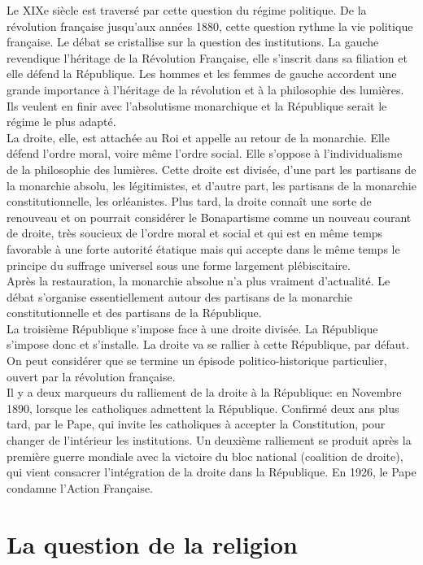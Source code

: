 \documentclass[10pt, a4paper, openany]{book}
\begin{document}
Le XIXe siècle est traversé par cette question du régime politique. De la révolution française jusqu'aux années 1880, cette question rythme la vie politique française. Le débat se cristallise sur la question des institutions. La gauche revendique l'héritage de la Révolution Française, elle s'inscrit dans sa filiation et elle défend la République. Les hommes et les femmes de gauche accordent une grande importance à l'héritage de la révolution et à la philosophie des lumières. Ils veulent en finir avec l'absolutisme monarchique et la République serait le régime le plus adapté. \\
La droite, elle, est attachée au Roi et appelle au retour de la monarchie. Elle défend l'ordre moral, voire même l'ordre social. Elle s'oppose à l'individualisme de la philosophie des lumières. Cette droite est divisée, d'une part les partisans de la monarchie absolu, les légitimistes, et d'autre part, les partisans de la monarchie constitutionnelle, les orléanistes. Plus tard, la droite connaît une sorte de renouveau et on pourrait considérer le Bonapartisme comme un nouveau courant de droite, très soucieux de l'ordre moral et social et qui est en même temps favorable à une forte autorité étatique mais qui accepte dans le même temps le principe du suffrage universel sous une forme largement plébiscitaire. \\
Après la restauration, la monarchie absolue n'a plus vraiment d'actualité. Le débat s'organise essentiellement autour des partisans de la monarchie constitutionnelle et des partisans de la République. \\
La troisième République s'impose face à une droite divisée. La République s'impose donc et s'installe. La droite va se rallier à cette République, par défaut. On peut considérer que se termine un épisode politico-historique particulier, ouvert par la révolution française. \\
Il y a deux marqueurs du ralliement de la droite à la République: en Novembre 1890, lorsque les catholiques admettent la République. Confirmé deux ans plus tard, par le Pape, qui invite les catholiques à accepter la Constitution, pour changer de l'intérieur les institutions. Un deuxième ralliement se produit après la première guerre mondiale avec la victoire du bloc national (coalition de droite), qui vient consacrer l'intégration de la droite dans la République. En 1926, le Pape condamne l'Action Française. 

\section{La question de la religion}
\end{document}
